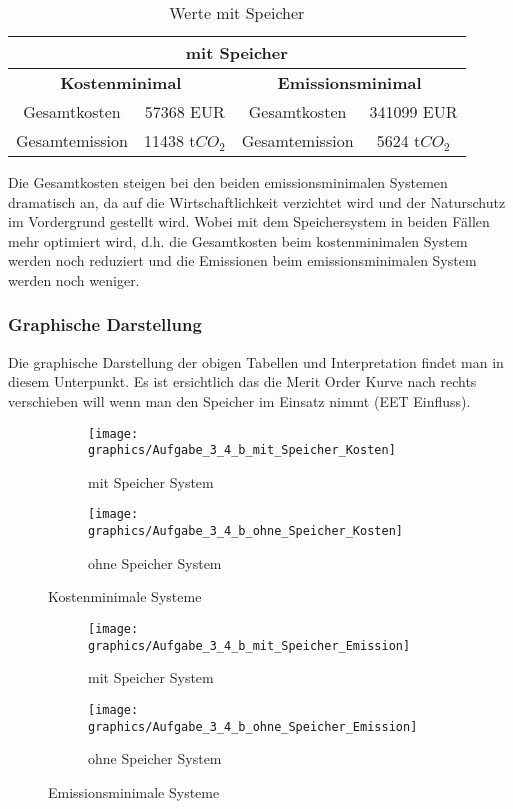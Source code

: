 \documentclass{eegreport}
\begin{document}
\begin{table}[h]
\begin{center}
\begin{tabular}{|c|c|c|c|}
\hline
\multicolumn{4}{|c|}{\textbf{mit Speicher}} \\
\hline 
\multicolumn{2}{|c|}{\textbf{Kostenminimal}} & \multicolumn{2}{|c|}{\textbf{Emissionsminimal}} \\ 
\hline 
Gesamtkosten & 57368 EUR & Gesamtkosten & 341099 EUR \\ 
\hline 
Gesamtemission & 11438 t$CO_2$ & Gesamtemission & 5624 t$CO_2$ \\ 
\hline 
\end{tabular} 
\end{center}
\caption{Werte mit Speicher}
\label{wms}
\end{table}		

Die Gesamtkosten steigen bei den beiden emissionsminimalen Systemen dramatisch an, da auf die Wirtschaftlichkeit verzichtet wird und der Naturschutz im Vordergrund gestellt wird. Wobei mit dem Speichersystem in beiden Fällen mehr optimiert wird, d.h. die Gesamtkosten beim kostenminimalen System werden noch reduziert und die Emissionen beim emissionsminimalen System werden noch weniger. 

\subsubsection{Graphische Darstellung}
Die graphische Darstellung der obigen Tabellen und Interpretation findet man in  diesem Unterpunkt. Es ist ersichtlich das die Merit Order Kurve nach rechts verschieben will wenn man den Speicher im Einsatz nimmt (EET Einfluss).

\begin{figure}
\begin{subfigure}{.5\textwidth}
  \centering
  \texttt{[image: graphics/Aufgabe\_3\_4\_b\_mit\_Speicher\_Kosten]}
  \caption{mit Speicher System}
  \label{fig:mssks}
\end{subfigure}%
\begin{subfigure}{.5\textwidth}
  \centering
  \texttt{[image: graphics/Aufgabe\_3\_4\_b\_ohne\_Speicher\_Kosten]}
  \caption{ohne Speicher System}
  \label{fig:ossks}
\end{subfigure}
\caption{Kostenminimale Systeme}
\label{fig:ks}
\end{figure}

\begin{figure}
\begin{subfigure}{.5\textwidth}
  \centering
  \texttt{[image: graphics/Aufgabe\_3\_4\_b\_mit\_Speicher\_Emission]}
  \caption{mit Speicher System}
  \label{fig:sfig1}
\end{subfigure}%
\begin{subfigure}{.5\textwidth}
  \centering
  \texttt{[image: graphics/Aufgabe\_3\_4\_b\_ohne\_Speicher\_Emission]}
  \caption{ohne Speicher System}
  \label{fig:sfig2}
\end{subfigure}
\caption{Emissionsminimale Systeme}
\label{fig:1}
\end{figure}
\end{document}

